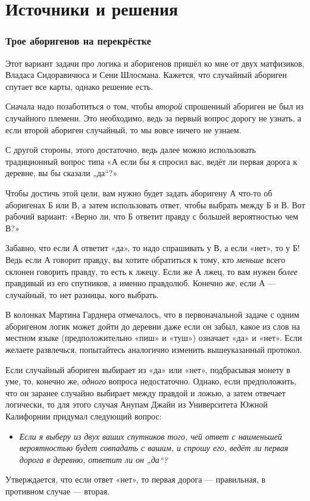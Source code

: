 \section*{Источники и решения}

\subsubsection*{Трое аборигенов на перекрёстке}

Этот вариант задачи про логика и аборигенов пришёл ко мне от двух матфизиков, Владаса Сидоравичюса и Сени Шлосмана.
Кажется, что случайный абориген спутает все карты, однако решение есть.

Сначала надо позаботиться о том, чтобы \emph{второй} спрошенный абориген не был из случайного племени.
Это необходимо, ведь за первый вопрос дорогу не узнать, а если второй абориген случайный, то мы вовсе ничего не узнаем.

С другой стороны, этого достаточно, ведь далее можно использовать традиционный вопрос типа «А если бы я спросил вас, ведёт ли первая дорога к деревне, вы бы сказали „да“?»

Чтобы достичь этой цели, вам нужно будет задать аборигену А что-то об аборигенах Б или В, а затем использовать ответ, чтобы выбрать между Б и В.
Вот рабочий вариант: «Верно ли, что Б ответит правду с большей вероятностью чем В?»

Забавно, что если А ответит «да», то надо спрашивать у В, а если «нет», то у Б!
Ведь если А говорит правду, вы хотите обратиться к тому, кто \emph{меньше} всего склонен говорить правду, то есть к лжецу.
Если же А лжец, то вам нужен \emph{более} правдивый из его спутников, а именно правдолюб.
Конечно же, если А --- случайный, то нет разницы, кого выбрать.

В колонках Мартина Гарднера отмечалось, что в первоначальной задаче с одним аборигеном логик может дойти до деревни даже если он забыл, какое из слов на местном языке (предположительно «пиш» и «туш») означает «да» и «нет».
Если желаете развлечься, попытайтесь аналогично изменить вышеуказанный протокол.

Если случайный абориген выбирает из «да» или «нет», подбрасывая монету в уме, то, конечно же, \emph{одного} вопроса недостаточно.
Однако, если предположить, что он заранее случайно выбирает между правдой и ложью, а затем отвечает логически,
то для этого случая Анупам Джайн из Университета Южной Калифорнии придумал следующий вопрос:
\begin{itemize}
 \item[] \emph{Если я выберу из двух ваших спутников того, чей ответ с наименьшей вероятностью будет совпадать с вашим, и спрошу его, ведёт ли первая дорога в деревню, ответит ли он „да“?}
\end{itemize}
Утверждается, что если ответ «нет», то первая дорога --- правильная, в противном случае --- вторая.


